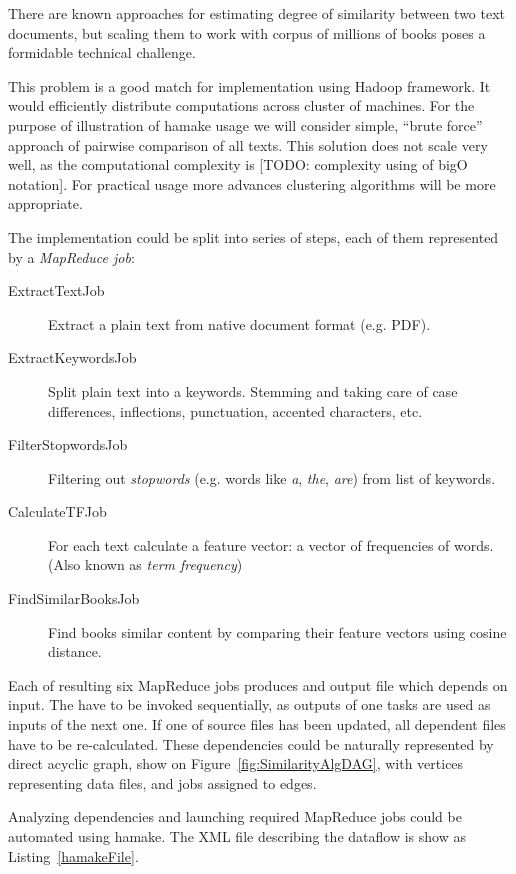 \documentclass[11pt,twocolumn]{article}
\begin{document}
There are known approaches for estimating degree of similarity between
two text documents, but scaling them to work with corpus of millions
of books poses a formidable technical challenge.

This problem is a good match for implementation using Hadoop
framework. It would efficiently distribute computations across cluster
of machines. For the purpose of illustration of hamake usage we will
consider simple, ``brute force'' approach of pairwise comparison of
all texts. This solution does not scale very well, as the
computational complexity is [TODO: complexity using of bigO
notation]. For practical usage more advances clustering algorithms
will be more appropriate.

The implementation could be split into series of steps, each of them
represented by a \textit{MapReduce job}:

\begin{description}
\item[ExtractTextJob] Extract a plain text from native document format
  (e.g. PDF).
\item[ExtractKeywordsJob] Split plain text into a keywords. Stemming and
  taking care of case differences, inflections, punctuation, accented
  characters, etc.
\item[FilterStopwordsJob] Filtering out \textit{stopwords} (e.g. words
  like \textit{a}, \textit{the}, \textit{are}) from list of keywords.
\item[CalculateTFJob] For each text calculate a feature vector: a
  vector of frequencies of words. (Also known as \textit{term
    frequency}\cite{manning2008introduction})
\item[FindSimilarBooksJob] Find books similar content by comparing their feature vectors
  using cosine distance\cite{wiki:cosinesimilarity}.
\end{description}

Each of resulting six MapReduce jobs produces and output file which
depends on input. The have to be invoked sequentially, as outputs of
one tasks are used as inputs of the next one. If one of source files
has been updated, all dependent files have to be re-calculated. These
dependencies could be naturally represented by direct acyclic graph,
show on Figure~\ref{fig:SimilarityAlgDAG}, with vertices representing
data files, and jobs assigned to edges.

Analyzing dependencies and launching required MapReduce jobs could be
automated using hamake. The XML file describing the dataflow is show
as Listing~\ref{hamakeFile}.
\end{document}
